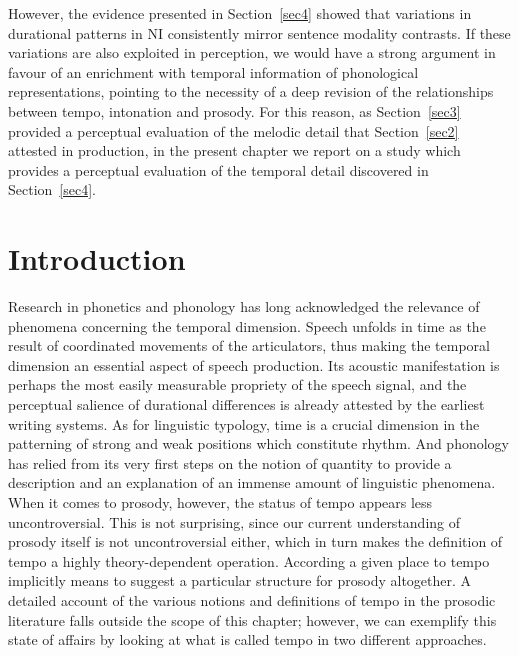 However, the evidence presented in Section~\ref{sec4} showed that variations in durational patterns in NI consistently mirror sentence modality contrasts. If these variations are also exploited in perception, we would have a strong argument in favour of an enrichment with temporal information of phonological representations, pointing to the necessity of a deep revision of the relationships between tempo, intonation and prosody. For this reason, as Section~\ref{sec3} provided a perceptual evaluation of the melodic detail that Section~\ref{sec2} attested in production, in the present chapter we report on a study \citep{cangemiFORTHtempo} which provides a perceptual evaluation of the temporal detail discovered in Section~\ref{sec4}.
\section{Introduction}\label{sec51}
Research in phonetics and phonology has long acknowledged the relevance of phenomena concerning the temporal dimension.
Speech unfolds in time as the result of coordinated movements of the articulators, thus making the temporal dimension an essential aspect of speech production. Its acoustic manifestation is perhaps the most easily measurable propriety of the speech signal, and the perceptual salience of durational differences is already attested by the earliest writing systems.
As for linguistic typology, time is a crucial dimension in the patterning of strong and weak positions which constitute rhythm.
And phonology has relied from its very first steps on the notion of quantity to provide a description and an explanation of an immense amount of linguistic phenomena.
When it comes to prosody, however, the status of tempo appears less uncontroversial. This is not surprising, since our current understanding of prosody itself is not uncontroversial either, which in turn makes the definition of tempo a highly theory-dependent operation. According a given place to tempo implicitly means to suggest a particular structure for prosody altogether. A detailed account of the various notions and definitions of tempo in the prosodic literature falls outside the scope of this chapter; however, we can exemplify this state of affairs by looking at what is called tempo in two different approaches.
